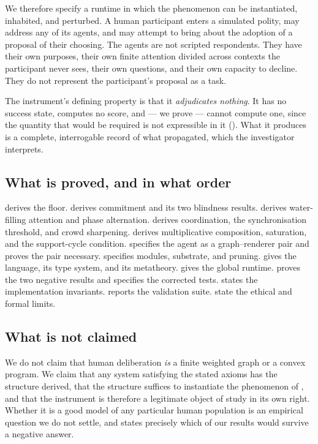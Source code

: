 \documentclass[11pt,a4paper]{article}
\theoremstyle{clstyle}
\theoremstyle{definition}
\theoremstyle{remark}
\begin{document}
We therefore specify a runtime in which the phenomenon can be instantiated,
inhabited, and perturbed. A human participant enters a simulated polity, may
address any of its agents, and may attempt to bring about the adoption of a
proposal of their choosing. The agents are not scripted respondents. They
have their own purposes, their own finite attention divided across contexts
the participant never sees, their own questions, and their own capacity to
decline. They do not represent the participant's proposal as a task.

The instrument's defining property is that it \emph{adjudicates nothing}. It
has no success state, computes no score, and --- we prove --- cannot compute
one, since the quantity that would be required is not expressible in it
(). What it produces is a complete,
interrogable record of what propagated, which the investigator interprets.

\subsection{What is proved, and in what order}

 derives the floor.  derives commitment and
its two blindness results.  derives water-filling
attention and phase alternation.  derives coordination,
the synchronisation threshold, and crowd sharpening. 
derives multiplicative composition, saturation, and the support-cycle
condition.  specifies the agent as a graph--renderer pair and
proves the pair necessary.  specifies modules,
substrate, and pruning.  gives the language, its type
system, and its metatheory.  gives the global runtime.
 proves the two negative results and specifies the
corrected tests.  states the implementation invariants.
 reports the validation suite.
 state the ethical and formal limits.

\subsection{What is not claimed}

We do not claim that human deliberation \emph{is} a finite weighted graph or
a convex program. We claim that any system satisfying the stated axioms has
the structure derived, that the structure suffices to instantiate the
phenomenon of , and that the instrument is therefore a
legitimate object of study in its own right. Whether it is a good model of
any particular human population is an empirical question we do not settle,
and  states precisely which of our results would survive a
negative answer.
\end{document}
